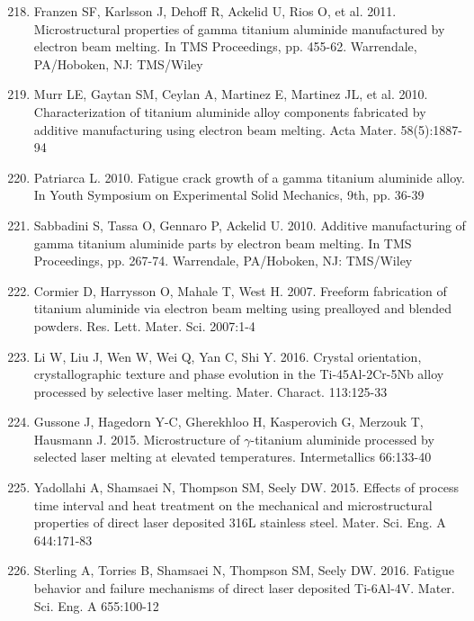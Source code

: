 \documentclass[10pt]{article}
\begin{document}
\begin{enumerate}
  \setcounter{enumi}{217}
  \item Franzen SF, Karlsson J, Dehoff R, Ackelid U, Rios O, et al. 2011. Microstructural properties of gamma titanium aluminide manufactured by electron beam melting. In TMS Proceedings, pp. 455-62. Warrendale, PA/Hoboken, NJ: TMS/Wiley

  \item Murr LE, Gaytan SM, Ceylan A, Martinez E, Martinez JL, et al. 2010. Characterization of titanium aluminide alloy components fabricated by additive manufacturing using electron beam melting. Acta Mater. 58(5):1887-94

  \item Patriarca L. 2010. Fatigue crack growth of a gamma titanium aluminide alloy. In Youth Symposium on Experimental Solid Mechanics, 9th, pp. 36-39

  \item Sabbadini S, Tassa O, Gennaro P, Ackelid U. 2010. Additive manufacturing of gamma titanium aluminide parts by electron beam melting. In TMS Proceedings, pp. 267-74. Warrendale, PA/Hoboken, NJ: TMS/Wiley

  \item Cormier D, Harrysson O, Mahale T, West H. 2007. Freeform fabrication of titanium aluminide via electron beam melting using prealloyed and blended powders. Res. Lett. Mater. Sci. 2007:1-4

  \item Li W, Liu J, Wen W, Wei Q, Yan C, Shi Y. 2016. Crystal orientation, crystallographic texture and phase evolution in the Ti-45Al-2Cr-5Nb alloy processed by selective laser melting. Mater. Charact. 113:125-33

  \item Gussone J, Hagedorn Y-C, Gherekhloo H, Kasperovich G, Merzouk T, Hausmann J. 2015. Microstructure of $\gamma$-titanium aluminide processed by selected laser melting at elevated temperatures. Intermetallics 66:133-40

  \item Yadollahi A, Shamsaei N, Thompson SM, Seely DW. 2015. Effects of process time interval and heat treatment on the mechanical and microstructural properties of direct laser deposited 316L stainless steel. Mater. Sci. Eng. A 644:171-83

  \item Sterling A, Torries B, Shamsaei N, Thompson SM, Seely DW. 2016. Fatigue behavior and failure mechanisms of direct laser deposited Ti-6Al-4V. Mater. Sci. Eng. A 655:100-12

\end{enumerate}
\end{document}
